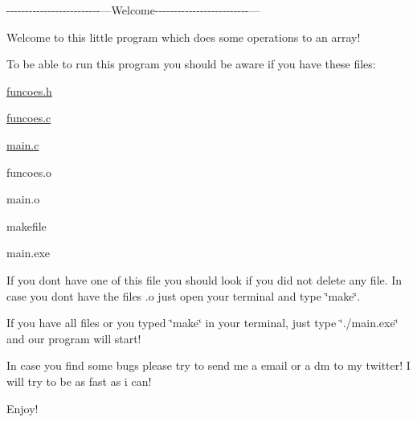 -\/-\/-\/-\/-\/-\/-\/-\/-\/-\/-\/-\/-\/-\/-\/-\/-\/-\/-\/-\/-\/-\/-\/-\/-\/---Welcome-\/-\/-\/-\/-\/-\/-\/-\/-\/-\/-\/-\/-\/-\/-\/-\/-\/-\/-\/-\/-\/-\/-\/-\/-\/---

Welcome to this little program which does some operations to an array!

To be able to run this program you should be aware if you have these files\+:
\begin{DoxyItemize}
\item \mbox{\hyperlink{funcoes_8h}{funcoes.\+h}}
\item \mbox{\hyperlink{funcoes_8c}{funcoes.\+c}}
\item \mbox{\hyperlink{main_8c}{main.\+c}}
\item funcoes.\+o
\item main.\+o
\item makefile
\item main.\+exe
\end{DoxyItemize}

If you don\textquotesingle{}t have one of this file you should look if you did not delete any file. In case you don\textquotesingle{}t have the files .o just open your terminal and type \char`\"{}make\char`\"{}.

If you have all files or you typed \char`\"{}make\char`\"{} in your terminal, just type \char`\"{}./main.\+exe\char`\"{} and our program will start!

In case you find some bugs please try to send me a email or a dm to my twitter! I will try to be as fast as i can!

Enjoy! 